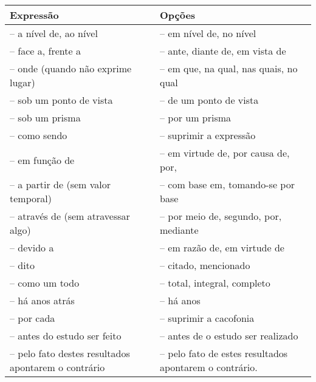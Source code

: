 \begin{tabular}{|L{7cm}|L{7cm}|}\hline
Expressão  &	Opções\\\hline
– a nível de, ao nível	& – em nível de, no nível\\\hline
– face a, frente a	&– ante, diante de, em vista de\\\hline
– onde (quando não exprime lugar)	& – em que, na qual, nas quais, no qual\\\hline
– sob um ponto de vista	& – de um ponto de vista\\\hline
– sob um prisma	& – por um prisma\\\hline
– como sendo	& – suprimir a expressão\\\hline
– em função de	& – em virtude de, por causa de, por,\\\hline
– a partir de (sem valor temporal)	& – com base em, tomando-se por base\\\hline
– através de (sem atravessar algo)	& – por meio de, segundo, por, mediante\\\hline
– devido a	& – em razão de, em virtude de\\\hline
– dito	& – citado, mencionado\\\hline
– como um todo	& – total, integral, completo\\\hline
– há anos atrás	& – há anos\\\hline
– por cada	& – suprimir a cacofonia\\\hline
– antes do estudo ser feito	& – antes de o estudo ser realizado\\\hline
– pelo fato destes resultados apontarem o contrário	& – pelo fato de estes resultados apontarem o contrário.\\\hline
\end{tabular}
